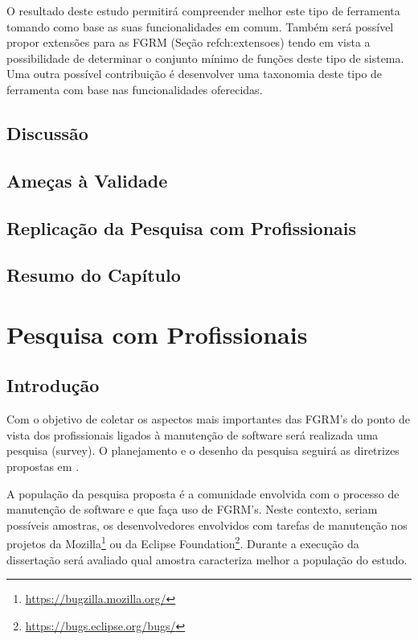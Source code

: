 \documentclass[msc]{ppgccufmg} %
\begin{document}
O resultado deste estudo permitirá compreender melhor este tipo de ferramenta tomando como base as suas funcionalidades em comum. Também será possível propor extensões para as FGRM (Seção ref{ch:extensoes}) tendo em vista a possibilidade de determinar o conjunto mínimo de funções deste tipo de sistema. Uma outra possível contribuição é desenvolver uma taxonomia deste tipo de ferramenta com base nas funcionalidades oferecidas.

\section{Discussão}

\section{Ameças à Validade}

\section{Replicação da Pesquisa com Profissionais}

\section{Resumo do Capítulo}


\chapter{Pesquisa com Profissionais}
\label{ch:pesquisa-profissionais}

\section{Introdução}
Com o objetivo de coletar os aspectos mais importantes das FGRM's do ponto de
vista dos profissionais ligados à manutenção de software será realizada uma
 pesquisa (survey). O planejamento e o desenho da pesquisa seguirá as diretrizes propostas em \cite{wohlin2012experimentation}.

A população da pesquisa proposta é a comunidade envolvida com o processo de
manutenção de software e que faça uso de FGRM's. Neste contexto, seriam
possíveis amostras, os desenvolvedores envolvidos com tarefas de manutenção nos
projetos da Mozilla\footnote{\url{https://bugzilla.mozilla.org/}} ou da
Eclipse Foundation\footnote{\url{https://bugs.eclipse.org/bugs/}}. Durante a
execução da dissertação será avaliado qual amostra caracteriza melhor a
população do estudo.
\end{document}
